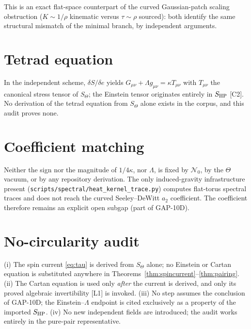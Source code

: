 \documentclass[11pt,a4paper]{article}
\begin{document}
This is an exact flat-space counterpart of the curved Gaussian-patch scaling
obstruction ($K\sim1/\rho$ kinematic versus $\tau\sim\rho$ sourced): both
identify the same structural mismatch of the minimal branch, by independent
arguments.

\section{Tetrad equation}
In the independent scheme, $\delta S/\delta e$ yields
$G_{\mu\nu}+\Lambda g_{\mu\nu}=\kappa T_{\mu\nu}$ with $T_{\mu\nu}$ the
canonical stress tensor of $S_\Theta$; the Einstein tensor originates
entirely in $S_{\rm HP}$ [C2].  No derivation of the tetrad equation from
$S_\Theta$ alone exists in the corpus, and this audit proves none.

\section{Coefficient matching}
Neither the sign nor the magnitude of $1/4\kappa$, nor $\Lambda$, is fixed
by $\mathcal N_0$, by the $\Theta$ vacuum, or by any repository derivation.
The only induced-gravity infrastructure present
(\texttt{scripts/spectral/heat\_kernel\_trace.py}) computes flat-torus
spectral traces and does not reach the curved Seeley--DeWitt $a_2$
coefficient.  The coefficient therefore remains an explicit open subgap
(part of GAP-10D).

\section{No-circularity audit}
(i) The spin current \eqref{eq:tau} is derived from $S_\Theta$ alone; no
Einstein or Cartan equation is substituted anywhere in
Theorems~\ref{thm:spincurrent}--\ref{thm:pairing}.
(ii) The Cartan equation is used only \emph{after} the current is derived,
and only its proved algebraic invertibility [L1] is invoked.
(iii) No step assumes the conclusion of GAP-10D; the Einstein--$\Lambda$
endpoint is cited exclusively as a property of the imported $S_{\rm HP}$.
(iv) No new independent fields are introduced; the audit works entirely in
the pure-pair representative.
\end{document}
